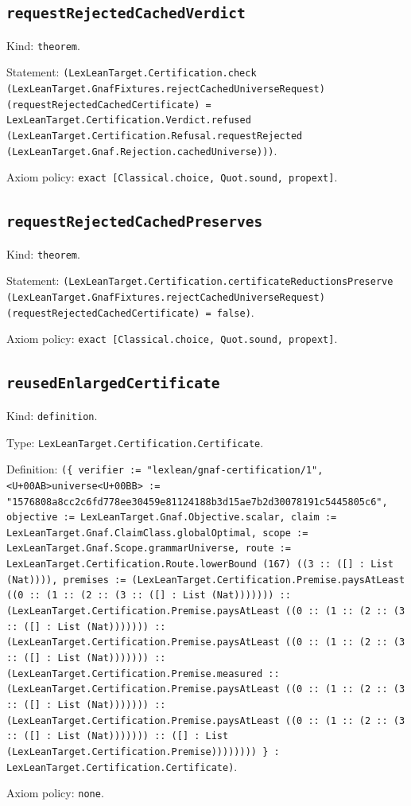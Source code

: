 \documentclass[11pt]{article}
\begin{document}
\subsection*{\texttt{requestRejectedCachedVerdict}}
\noindent Kind: \texttt{theorem}.\par
\noindent Statement: \texttt{(LexLeanTarget.Certification.check (LexLeanTarget.GnafFixtures.rejectCachedUniverseRequest) (requestRejectedCachedCertificate) = LexLeanTarget.Certification.Verdict.refused (LexLeanTarget.Certification.Refusal.requestRejected (LexLeanTarget.Gnaf.Rejection.cachedUniverse)))}.\par
\noindent Axiom policy: \texttt{exact [Classical.choice, Quot.sound, propext]}.\par
\subsection*{\texttt{requestRejectedCachedPreserves}}
\noindent Kind: \texttt{theorem}.\par
\noindent Statement: \texttt{(LexLeanTarget.Certification.certificateReductionsPreserve (LexLeanTarget.GnafFixtures.rejectCachedUniverseRequest) (requestRejectedCachedCertificate) = false)}.\par
\noindent Axiom policy: \texttt{exact [Classical.choice, Quot.sound, propext]}.\par
\subsection*{\texttt{reusedEnlargedCertificate}}
\noindent Kind: \texttt{definition}.\par
\noindent Type: \texttt{LexLeanTarget.Certification.Certificate}.\par
\noindent Definition: \texttt{(\{ verifier := "lexlean/gnaf-certification/1", <U+00AB>universe<U+00BB> := "1576808a8cc2c6fd778ee30459e81124188b3d15ae7b2d30078191c5445805c6", objective := LexLeanTarget.Gnaf.Objective.scalar, claim := LexLeanTarget.Gnaf.ClaimClass.globalOptimal, scope := LexLeanTarget.Gnaf.Scope.grammarUniverse, route := LexLeanTarget.Certification.Route.lowerBound (167) ((3 :: ([] : List (Nat)))), premises := (LexLeanTarget.Certification.Premise.paysAtLeast ((0 :: (1 :: (2 :: (3 :: ([] : List (Nat))))))) :: (LexLeanTarget.Certification.Premise.paysAtLeast ((0 :: (1 :: (2 :: (3 :: ([] : List (Nat))))))) :: (LexLeanTarget.Certification.Premise.paysAtLeast ((0 :: (1 :: (2 :: (3 :: ([] : List (Nat))))))) :: (LexLeanTarget.Certification.Premise.measured :: (LexLeanTarget.Certification.Premise.paysAtLeast ((0 :: (1 :: (2 :: (3 :: ([] : List (Nat))))))) :: (LexLeanTarget.Certification.Premise.paysAtLeast ((0 :: (1 :: (2 :: (3 :: ([] : List (Nat))))))) :: ([] : List (LexLeanTarget.Certification.Premise)))))))) \} : LexLeanTarget.Certification.Certificate)}.\par
\noindent Axiom policy: \texttt{none}.\par
\end{document}
